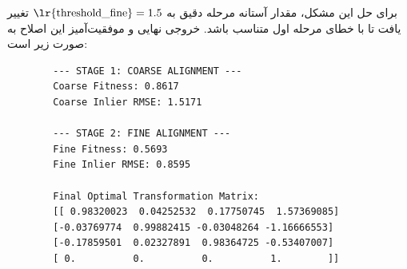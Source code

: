 \documentclass[12pt,a4paper]{article}
\begin{document}
برای حل این مشکل، مقدار آستانه مرحله دقیق به $\text{\lr{threshold\_fine}} = 1.5$ تغییر یافت تا با خطای  مرحله اول متناسب باشد. خروجی نهایی و موفقیت‌آمیز این اصلاح به صورت زیر است:

\begin{latin}
	\begin{verbatim}
		--- STAGE 1: COARSE ALIGNMENT ---
		Coarse Fitness: 0.8617
		Coarse Inlier RMSE: 1.5171
		
		--- STAGE 2: FINE ALIGNMENT ---
		Fine Fitness: 0.5693
		Fine Inlier RMSE: 0.8595
		
		Final Optimal Transformation Matrix:
		[[ 0.98320023  0.04252532  0.17750745  1.57369085]
		[-0.03769774  0.99882415 -0.03048264 -1.16666553]
		[-0.17859501  0.02327891  0.98364725 -0.53407007]
		[ 0.          0.          0.          1.        ]]
	\end{verbatim}
\end{latin}
\end{document}
